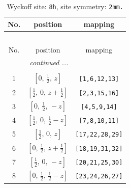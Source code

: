 \documentclass[fleqn,8pt]{jsarticle}
\begin{document}
\begin{longtable}{ccc}
\caption{Wyckoff site: {\tt 8h}, site symmetry: {\tt 2mm.}}
 \\
 \hline \hline
No. & position & mapping \\ \hline \endfirsthead

\multicolumn{2}{l}{\tablename\ \thetable{}} \\
 \hline \hline
No. & position & mapping \\ \hline \endhead

 \hline \hline
\multicolumn{2}{r}{\footnotesize\it continued ...} \\ \endfoot

 \hline \hline
\multicolumn{2}{r}{} \\ \endlastfoot

1 & $\left[ 0,\, \frac{1}{2},\, z \right]$ & {\tt [1,6,12,13]} \\ \hline
2 & $\left[ \frac{1}{2},\, 0,\, z + \frac{1}{2} \right]$ & {\tt [2,3,15,16]} \\ \hline
3 & $\left[ 0,\, \frac{1}{2},\, - z \right]$ & {\tt [4,5,9,14]} \\ \hline
4 & $\left[ \frac{1}{2},\, 0,\, \frac{1}{2} - z \right]$ & {\tt [7,8,10,11]} \\ \hline
5 & $\left[ \frac{1}{2},\, 0,\, z \right]$ & {\tt [17,22,28,29]} \\ \hline
6 & $\left[ 0,\, \frac{1}{2},\, z + \frac{1}{2} \right]$ & {\tt [18,19,31,32]} \\ \hline
7 & $\left[ \frac{1}{2},\, 0,\, - z \right]$ & {\tt [20,21,25,30]} \\ \hline
8 & $\left[ 0,\, \frac{1}{2},\, \frac{1}{2} - z \right]$ & {\tt [23,24,26,27]} \\
\end{longtable}
\renewcommand{\arraystretch}{1.2}
\end{document}
